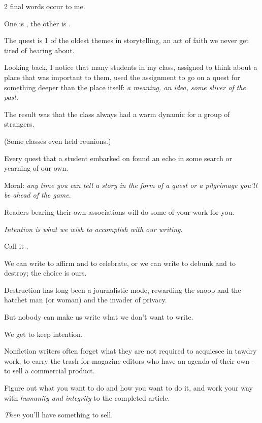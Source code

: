 \documentclass{book}
\numberwithin{equation}{section}
\begin{document}
%
2 final words occur to me.

One is , the other is .

%
The quest is 1 of the oldest themes in storytelling, an act of faith we never get tired of hearing about.

Looking back, I notice that many students in my class, assigned to think about a place that was important to them, used the assignment to go on a quest for something deeper than the place itself: \textit{a meaning, an idea, some sliver of the past}.

The result was that the class always had a warm dynamic for a group of strangers.

(Some classes even held reunions.)

Every quest that a student embarked on found an echo in some search or yearning of our own.

Moral: \textit{any time you can tell a story in the form of a quest or a pilgrimage you'll be ahead of the game}.

Readers bearing their own associations will do some of your work for you.

%
\textit{Intention is what we wish to accomplish with our writing}.

Call it .

We can write to affirm and to celebrate, or we can write to debunk and to destroy; the choice is ours.

Destruction has long been a journalistic mode, rewarding the snoop and the hatchet man (or woman) and the invader of privacy.

But nobody can make us write what we don't want to write.

We get to keep intention.

Nonfiction writers often forget what they are not required to acquiesce in tawdry work, to carry the trash for magazine editors who have an agenda of their own - to sell a commercial product.

%



Figure out what you want to do and how you want to do it, and work your way with \textit{humanity and integrity} to the completed article.

\textit{Then} you'll have something to sell.
\end{document}

